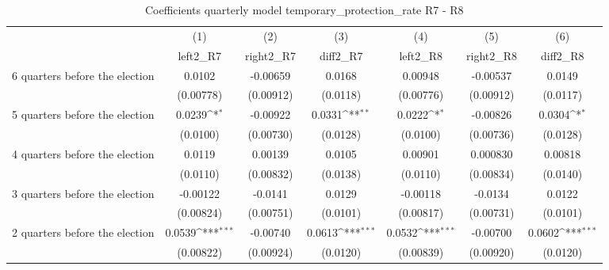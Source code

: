 \begin{table}[!ht]\centering \footnotesize
\def\sym#1{\ifmmode^{#1}\else\(^{#1}\)\fi}
\caption{Coefficients quarterly model temporary\_protection\_rate R7 - R8}
\begin{tabular}{l*{6}{c}}
\hline\hline
                    &\multicolumn{1}{c}{(1)}&\multicolumn{1}{c}{(2)}&\multicolumn{1}{c}{(3)}&\multicolumn{1}{c}{(4)}&\multicolumn{1}{c}{(5)}&\multicolumn{1}{c}{(6)}\\
                    &\multicolumn{1}{c}{left2\_R7}&\multicolumn{1}{c}{right2\_R7}&\multicolumn{1}{c}{diff2\_R7}&\multicolumn{1}{c}{left2\_R8}&\multicolumn{1}{c}{right2\_R8}&\multicolumn{1}{c}{diff2\_R8}\\
\hline
 6 quarters before the election&      0.0102         &    -0.00659         &      0.0168         &     0.00948         &    -0.00537         &      0.0149         \\
                    &   (0.00778)         &   (0.00912)         &    (0.0118)         &   (0.00776)         &   (0.00912)         &    (0.0117)         \\
[1em]
 5 quarters before the election&      0.0239\sym{*}  &    -0.00922         &      0.0331\sym{**} &      0.0222\sym{*}  &    -0.00826         &      0.0304\sym{*}  \\
                    &    (0.0100)         &   (0.00730)         &    (0.0128)         &    (0.0100)         &   (0.00736)         &    (0.0128)         \\
[1em]
 4 quarters before the election&      0.0119         &     0.00139         &      0.0105         &     0.00901         &    0.000830         &     0.00818         \\
                    &    (0.0110)         &   (0.00832)         &    (0.0138)         &    (0.0110)         &   (0.00834)         &    (0.0140)         \\
[1em]
 3 quarters before the election&    -0.00122         &     -0.0141         &      0.0129         &    -0.00118         &     -0.0134         &      0.0122         \\
                    &   (0.00824)         &   (0.00751)         &    (0.0101)         &   (0.00817)         &   (0.00731)         &    (0.0101)         \\
[1em]
 2 quarters before the election&      0.0539\sym{***}&    -0.00740         &      0.0613\sym{***}&      0.0532\sym{***}&    -0.00700         &      0.0602\sym{***}\\
                    &   (0.00822)         &   (0.00924)         &    (0.0120)         &   (0.00839)         &   (0.00920)         &    (0.0120)         \\

\end{tabular}
\end{table}
